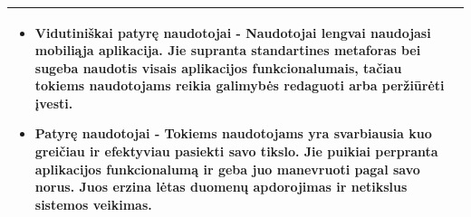 \documentclass{VUMIFPSkursinis}
\begin{document}
\begin{table}[H]
{\begin{tabular}{|p{}|p{}|}
\begin{itemize}
							  \item	Vidutiniškai patyrę naudotojai - Naudotojai lengvai naudojasi mobiliąja aplikacija. Jie supranta standartines metaforas bei sugeba naudotis visais aplikacijos funkcionalumais, tačiau tokiems naudotojams reikia galimybės redaguoti arba peržiūrėti įvesti.

							  \item	Patyrę naudotojai - Tokiems naudotojams yra svarbiausia kuo greičiau ir efektyviau pasiekti savo tikslo. Jie puikiai perpranta aplikacijos funkcionalumą ir geba juo manevruoti pagal savo norus. Juos erzina lėtas duomenų apdorojimas ir netikslus  sistemos veikimas.

						  \end{itemize}      			\\
    \hline
  \end{tabular}}
  \label{tab:pirminiai}
\end{table}
\end{document}
